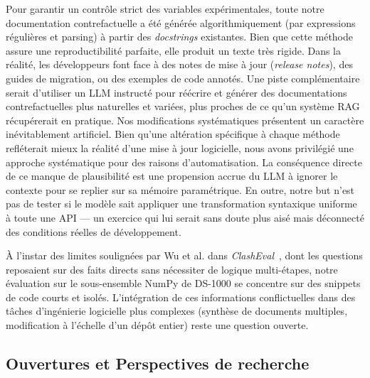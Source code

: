 \documentclass[11pt, a4paper]{article}
\begin{document}
Pour garantir un contrôle strict des variables expérimentales, toute notre documentation contrefactuelle a été générée algorithmiquement (par expressions régulières et parsing) à partir des \textit{docstrings} existantes. Bien que cette méthode assure une reproductibilité parfaite, elle produit un texte très rigide. Dans la réalité, les développeurs font face à des notes de mise à jour (\textit{release notes}), des guides de migration, ou des exemples de code annotés. Une piste complémentaire serait d'utiliser un LLM instructé pour réécrire et générer des documentations contrefactuelles plus naturelles et variées, plus proches de ce qu'un système RAG récupérerait en pratique.
Nos modifications systématiques présentent un caractère inévitablement artificiel. Bien qu'une altération spécifique à chaque méthode refléterait mieux la réalité d'une mise à jour logicielle, nous avons privilégié une approche systématique pour des raisons d'automatisation. La conséquence directe de ce manque de plausibilité est une propension accrue du LLM à ignorer le contexte pour se replier sur sa mémoire paramétrique. En outre, notre but n'est pas de tester si le modèle sait appliquer une transformation syntaxique uniforme à toute une API — un exercice qui lui serait sans doute plus aisé mais déconnecté des conditions réelles de développement.

À l'instar des limites soulignées par Wu et al. dans \textit{ClashEval}~\cite{clasheval2024}, dont les questions reposaient sur des faits directs sans nécessiter de logique multi-étapes, notre évaluation sur le sous-ensemble NumPy de DS-1000 se concentre sur des snippets de code courts et isolés. L'intégration de ces informations conflictuelles dans des tâches d'ingénierie logicielle plus complexes (synthèse de documents multiples, modification à l'échelle d'un dépôt entier) reste une question ouverte.

\subsection{Ouvertures et Perspectives de recherche}
\end{document}
